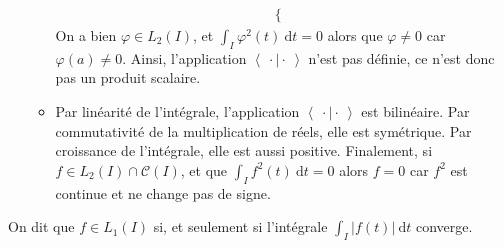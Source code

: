 \begin{exo}
\begin{enumerate}
\begin{itemize}
\begin{align*}
\begin{cases}
						\end{cases}
					\end{align*}
					On a bien $\varphi \in L_2(I)$, et $\int_{I} \varphi^2(t)~\mathrm{d}t = 0$\/ alors que $\varphi \neq 0$\/ car $\varphi(a) \neq 0$. Ainsi, l'application $\left<\:\cdot  \mid \cdot \: \right>$\/ n'est pas définie, ce n'est donc pas un produit scalaire.
				\item Par linéarité de l'intégrale, l'application $\left<\:\cdot  \mid \cdot \: \right>$\/ est bilinéaire. Par commutativité de la multiplication de réels, elle est symétrique. Par croissance de l'intégrale, elle est aussi positive. Finalement, si $f \in L_2(I) \cap \mathcal{C}(I)$, et que $\int_{I} f^2(t)~\mathrm{d}t  = 0$\/ alors $f = 0$\/ car $f^2$\/ est continue et ne change pas de signe.
			\end{itemize}
	\end{enumerate}
\end{exo}

\begin{rmkn}[``Secret'']
	On dit que $f \in L_1(I)$\/ si, et seulement si l'intégrale $\int_{I} \big|f(t)\big|~\mathrm{d}t$\/ converge.
\end{rmkn}

